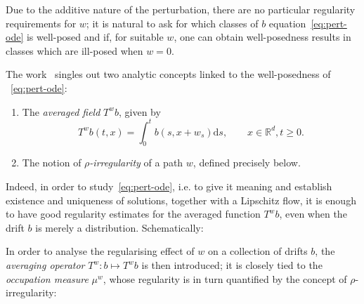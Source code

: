 \documentclass[10pt]{article}
\newcommand{\mathd}{\mathrm{d}}
\newcommand{\tmtextit}[1]{{\itshape{#1}}}
\begin{document}
Due to the additive nature of the perturbation, there are no particular
regularity requirements for $w$; it is natural to ask for which classes of $b$
equation~\eqref{eq:pert-ode} is well-posed and if, for suitable $w$, one can
obtain well-posedness results in classes which are ill-posed when $w = 0$.

The work~{\cite{catelliergubinelli}} singles out two analytic concepts linked
to the well-posedness of ~\eqref{eq:pert-ode}:
\begin{enumerate}
  \item The \tmtextit{averaged field} $T^w b$, given by
  \[ T^w b (t, x) = \int_0^t b (s, x + w_s) \mathd s, \qquad x \in
     \mathbb{R}^d, t \geqslant 0. \]
  \item The notion of \tmtextit{$\rho$-irregularity} of a path $w$, defined
  precisely below.
\end{enumerate}
Indeed, in order to study~\eqref{eq:pert-ode}, i.e. to give it meaning and
establish existence and uniqueness of solutions, together with a Lipschitz
flow, it is enough to have good regularity estimates for the averaged function
$T^w b$, even when the drift $b$ is merely a distribution. Schematically:

\begin{center}
\end{center}

In order to analyse the regularising effect of $w$ on a collection of drifts
$b$, the \tmtextit{averaging operator} $T^w : b \mapsto T^w b$ is then
introduced; it is closely tied to the \tmtextit{occupation measure} $\mu^w$,
whose regularity is in turn quantified by the concept of $\rho$-irregularity:

\

\begin{center}
\end{center}
\end{document}
